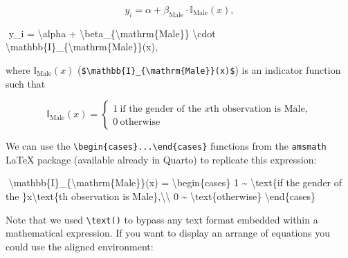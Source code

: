 \documentclass[
  letterpaper,
  DIV=11,
  numbers=noendperiod]{scrartcl}
\newenvironment{Shaded}{\begin{snugshade}}{\end{snugshade}}
\newcommand{\ExtensionTok}[1]{\textcolor[rgb]{0.00,0.23,0.31}{#1}}
\newcommand{\KeywordTok}[1]{\textcolor[rgb]{0.00,0.23,0.31}{#1}}
\newcommand{\NormalTok}[1]{\textcolor[rgb]{0.00,0.23,0.31}{#1}}
\newcommand{\SpecialCharTok}[1]{\textcolor[rgb]{0.37,0.37,0.37}{#1}}
\newcommand{\SpecialStringTok}[1]{\textcolor[rgb]{0.13,0.47,0.30}{#1}}
\begin{document}
\[y_i = \alpha + \beta_{\mbox{Male}} \cdot \mathbb{I}_{\mbox{Male}}(x),\]

\begin{Shaded}
\begin{Highlighting}[]
\SpecialStringTok{$$}
\SpecialStringTok{y\_i = }\SpecialCharTok{\textbackslash{}alpha}\SpecialStringTok{ + }\SpecialCharTok{\textbackslash{}beta}\SpecialStringTok{\_\{}\SpecialCharTok{\textbackslash{}mathrm}\SpecialStringTok{\{Male\}\} }\SpecialCharTok{\textbackslash{}cdot}\SpecialStringTok{ }\SpecialCharTok{\textbackslash{}mathbb}\SpecialStringTok{\{I\}\_\{}\SpecialCharTok{\textbackslash{}mathrm}\SpecialStringTok{\{Male\}\}(x),}
\SpecialStringTok{$$}
\end{Highlighting}
\end{Shaded}

where \(\mathbb{I}_{\mbox{Male}}(x)\)
(\texttt{\$\textbackslash{}mathbb\{I\}\_\{\textbackslash{}mathrm\{Male\}\}(x)\$})
is an indicator function such that

\[
\mathbb{I}_{\mathrm{Male}}(x) =
\begin{cases} 
1 ~ \text{if the gender of the }x\text{th observation is Male},\\
0 ~ \text{otherwise}
\end{cases}
\]

We can use the
\texttt{\textbackslash{}begin\{cases\}...\textbackslash{}end\{cases\}}
functions from the \texttt{amsmath} LaTeX package (available already in
Quarto) to replicate this expression:

\begin{Shaded}
\begin{Highlighting}[]
\SpecialStringTok{$$}
\SpecialCharTok{\textbackslash{}mathbb}\SpecialStringTok{\{I\}\_\{}\SpecialCharTok{\textbackslash{}mathrm}\SpecialStringTok{\{Male\}\}(x) =}
\KeywordTok{\textbackslash{}begin}\NormalTok{\{}\ExtensionTok{cases}\NormalTok{\}}\SpecialStringTok{ }
\SpecialStringTok{1 \textasciitilde{} }\SpecialCharTok{\textbackslash{}text}\NormalTok{\{if the gender of the \}}\SpecialStringTok{x}\SpecialCharTok{\textbackslash{}text}\SpecialStringTok{\{th observation is Male\},}\SpecialCharTok{\textbackslash{}\textbackslash{}}
\SpecialStringTok{0 \textasciitilde{} }\SpecialCharTok{\textbackslash{}text}\NormalTok{\{otherwise\}}
\KeywordTok{\textbackslash{}end}\NormalTok{\{}\ExtensionTok{cases}\NormalTok{\}}
\SpecialStringTok{$$}
\end{Highlighting}
\end{Shaded}

Note that we used \texttt{\textbackslash{}text()} to bypass any text
format embedded within a mathematical expression. If you want to display
an arrange of equations you could use the aligned environment:
\end{document}
